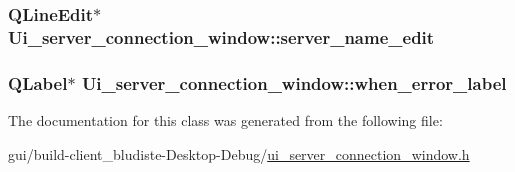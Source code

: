 \hypertarget{classUi__server__connection__window_a2d2674c180c60ce36dc7b01988779448}{
\subsubsection[{server\-\_\-name\-\_\-edit}]{\setlength{\rightskip}{0pt plus 5cm}Q\-Line\-Edit$\ast$ Ui\-\_\-server\-\_\-connection\-\_\-window\-::server\-\_\-name\-\_\-edit}}\label{classUi__server__connection__window_a2d2674c180c60ce36dc7b01988779448}
\hypertarget{classUi__server__connection__window_aaa93b479324f97d626b83f2286c298a8}{
\subsubsection[{when\-\_\-error\-\_\-label}]{\setlength{\rightskip}{0pt plus 5cm}Q\-Label$\ast$ Ui\-\_\-server\-\_\-connection\-\_\-window\-::when\-\_\-error\-\_\-label}}\label{classUi__server__connection__window_aaa93b479324f97d626b83f2286c298a8}


The documentation for this class was generated from the following file\-:\begin{DoxyCompactItemize}
\item 
gui/build-\/client\-\_\-bludiste-\/\-Desktop-\/\-Debug/\hyperlink{ui__server__connection__window_8h}{ui\-\_\-server\-\_\-connection\-\_\-window.\-h}\end{DoxyCompactItemize}
